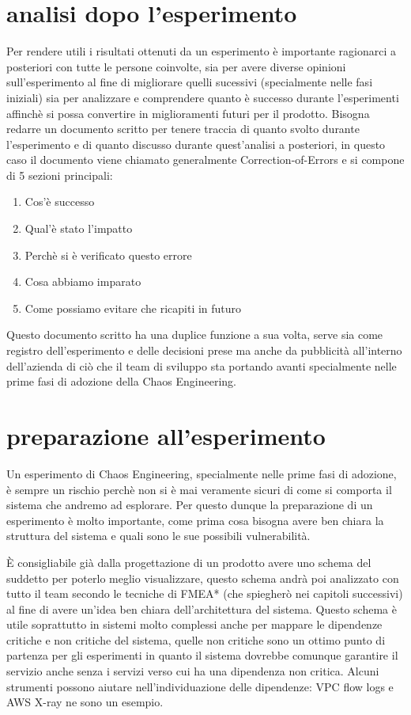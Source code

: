 \section{analisi dopo l'esperimento}
Per rendere utili i risultati ottenuti da un esperimento è importante ragionarci a posteriori con tutte le persone coinvolte, sia per avere diverse opinioni sull'esperimento al fine di migliorare quelli sucessivi (specialmente nelle fasi iniziali) sia per analizzare e comprendere quanto è successo durante l'esperimenti affinchè si possa convertire in miglioramenti futuri per il prodotto.
Bisogna redarre un documento scritto per tenere traccia di quanto svolto durante l'esperimento e di quanto discusso durante quest'analisi a posteriori, in questo caso il documento viene chiamato generalmente Correction-of-Errors e si compone di 5 sezioni principali:
\begin{enumerate}
    \item Cos'è successo
    \item Qual'è stato l'impatto
    \item Perchè si è verificato questo errore
    \item Cosa abbiamo imparato
    \item Come possiamo evitare che ricapiti in futuro
\end{enumerate}
Questo documento scritto ha una duplice funzione a sua volta, serve sia come registro dell'esperimento e delle decisioni prese ma anche da pubblicità all'interno dell'azienda di ciò che il team di sviluppo sta portando avanti specialmente nelle prime fasi di adozione della Chaos Engineering.

\section{preparazione all'esperimento}
Un esperimento di Chaos Engineering, specialmente nelle prime fasi di adozione, è sempre un rischio perchè non si è mai veramente sicuri di come si comporta il sistema che andremo ad esplorare.
Per questo dunque la preparazione di un esperimento è molto importante, come prima cosa bisogna avere ben chiara la struttura del sistema e quali sono le sue possibili vulnerabilità.

È consigliabile già dalla progettazione di un prodotto avere uno schema del suddetto per poterlo meglio visualizzare, questo schema andrà poi analizzato con tutto il team secondo le tecniche di FMEA* (che spiegherò nei capitoli successivi) al fine di avere un'idea ben chiara dell'architettura del sistema.
Questo schema è utile soprattutto in sistemi molto complessi anche per mappare le dipendenze critiche e non critiche del sistema, quelle non critiche sono un ottimo punto di partenza per gli esperimenti in quanto il sistema dovrebbe comunque garantire il servizio anche senza i servizi verso cui ha una dipendenza non critica.
Alcuni strumenti possono aiutare nell'individuazione delle dipendenze: VPC flow logs e AWS X-ray ne sono un esempio.

